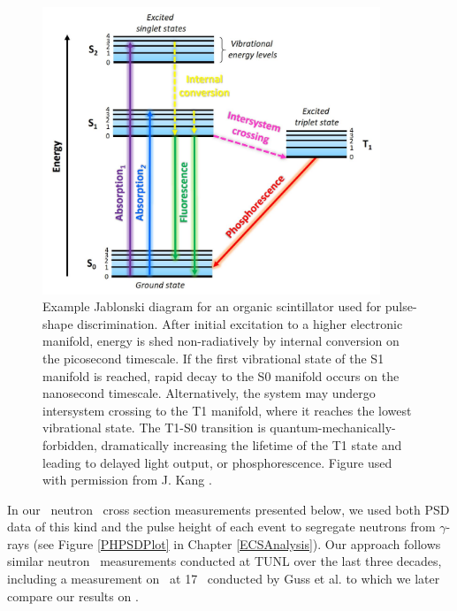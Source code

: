 \begin{figure}[h]
    \centering
    \includegraphics[width = 0.9\textwidth]{figures/JablonskiExample_KangDissertation.png}
    \caption[Example Jablonski diagram for organic scintillator]
    {
        Example Jablonski diagram for an organic scintillator used for
        pulse-shape discrimination. After initial excitation to a higher
        electronic manifold, energy is shed non-radiatively by internal
        conversion on the picosecond timescale. If the first vibrational state of the S1
        manifold is reached, rapid decay to the S0 manifold occurs on the
        nanosecond timescale. Alternatively, the system may undergo intersystem
        crossing to the T1 manifold, where it reaches the lowest vibrational
        state. The T1-S0 transition is quantum-mechanically-forbidden,
        dramatically increasing the lifetime of the T1 state and leading to
        delayed light output, or phosphorescence. Figure used with permission 
        from J. Kang \cite{KangPhDThesis}. 
    }
    \label{JablonskiExample}
\end{figure}

In our \snTwelveFour\ neutron \el\ cross section measurements presented below,
we used both PSD data of this kind and the pulse height of each
event to segregate neutrons from $\gamma$-rays (see Figure \ref{PHPSDPlot} in Chapter
\ref{ECSAnalysis}). Our approach follows similar neutron \el\ measurements
conducted at TUNL over the last three decades,
including a measurement on \snTwenty\ at 17 \mega\electronvolt\ conducted by Guss et al.
\cite{Guss1989, GussPhDThesis} to which we later compare our results on
\snTwelveFour.

